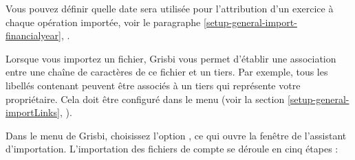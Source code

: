 Vous pouvez définir quelle date sera utilisée pour l'attribution d'un exercice à 
chaque opération importée, voir le paragraphe \vref{setup-general-import-financialyear}, .

Lorsque vous importez un fichier, Grisbi vous permet d'établir une association entre une chaîne de caractères de ce fichier et un tiers. Par exemple, tous les libellés contenant  peuvent être associés à un tiers qui représente votre propriétaire. Cela doit être configuré dans le menu  (voir la section \vref{setup-general-importLinks}, ).

Dans le menu  de Grisbi, choisissez l'option , ce qui ouvre la fenêtre de l'assistant d'importation. L'importation des fichiers de compte se déroule en cinq étapes :

